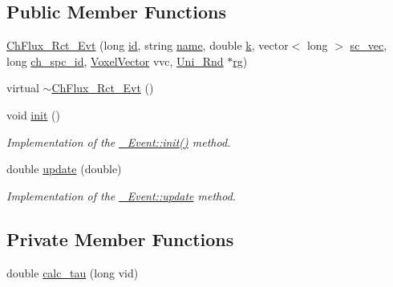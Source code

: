 \subsection*{Public Member Functions}
\begin{DoxyCompactItemize}
\item 
\hyperlink{classnw_1_1_ch_flux___rct___evt_ab54a4c1b86a428cf540967fc0d575b56}{Ch\+Flux\+\_\+\+Rct\+\_\+\+Evt} (long \hyperlink{classnw_1_1___event_a8f7ce287f596266dd763ec7db2f74090}{id}, string \hyperlink{classnw_1_1___event_ab4f50a54039cd4957bdca55049178562}{name}, double \hyperlink{classnw_1_1___event_afca0ae816e9834add07db8e9a6618faa}{k}, vector$<$ long $>$ \hyperlink{classnw_1_1___event_a560c8b6f9954a43f5d5f80204473b64d}{sc\+\_\+vec}, long \hyperlink{classnw_1_1_ch_flux___rct___evt_a29702aefc95f39082b9d8a9278e3b0f8}{ch\+\_\+spc\+\_\+id}, \hyperlink{namespacenw_ad7146b8b5a9de9be416847f41135722c}{Voxel\+Vector} vvc, \hyperlink{classnw_1_1_uni___rnd}{Uni\+\_\+\+Rnd} $\ast$\hyperlink{classnw_1_1___event_af92482aeea55562560573ecccd5ab108}{rg})
\item 
virtual \hyperlink{classnw_1_1_ch_flux___rct___evt_ada973af5af7cb1ea6c341fd64dd0f850}{$\sim$\+Ch\+Flux\+\_\+\+Rct\+\_\+\+Evt} ()
\item 
void \hyperlink{classnw_1_1_ch_flux___rct___evt_a59d8b2ededb919b5b2cf4358de9a6137}{init} ()
\begin{DoxyCompactList}\small\item\em Implementation of the \hyperlink{classnw_1_1___event_ae2c608ee2508058d6f318ca2ca8f4317}{\+\_\+\+Event\+::init()} method. \end{DoxyCompactList}\item 
double \hyperlink{classnw_1_1_ch_flux___rct___evt_a4034ee90e8ec27a92665a5591fad165d}{update} (double)
\begin{DoxyCompactList}\small\item\em Implementation of the \hyperlink{classnw_1_1___event_a882115f8652c881bc8ed43f1050ccba3}{\+\_\+\+Event\+::update} method. \end{DoxyCompactList}\end{DoxyCompactItemize}
\subsection*{Private Member Functions}
\begin{DoxyCompactItemize}
\item 
double \hyperlink{classnw_1_1_ch_flux___rct___evt_a929abfad936dfc3501b8b5b523112ab9}{calc\+\_\+tau} (long vid)
\end{DoxyCompactItemize}
